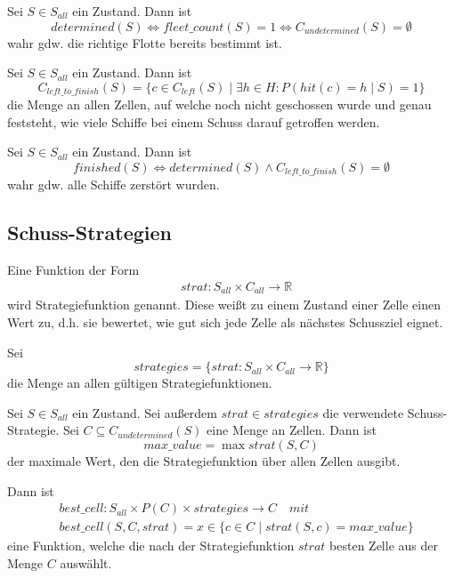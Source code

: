 \documentclass[a4paper,12pt]{llncs}
\numberwithin{equation}{section}
\begin{document}
\begin{definition}
Sei $S\in S_{all}$ ein Zustand.
Dann ist
\[
determined(S) \Leftrightarrow fleet\_count(S)=1 \Leftrightarrow C_{undetermined}(S) = \emptyset
\]
wahr gdw. die richtige Flotte bereits bestimmt ist.
\end{definition}


\begin{definition}
Sei $S\in S_{all}$ ein Zustand.
Dann ist
\[
C_{left\_to\_finish}(S)=\{ c \in C_{left}(S) \mid \exists h \in H \colon P(hit(c)=h \mid S) = 1\}
\]
die Menge an allen Zellen, auf welche noch nicht geschossen wurde und genau feststeht, wie viele Schiffe bei einem Schuss darauf getroffen werden.
\end{definition}

\begin{definition}
Sei $S\in S_{all}$ ein Zustand.
Dann ist
\[
finished(S) \Leftrightarrow determined(S) \land C_{left\_to\_finish}(S) = \emptyset
\]
wahr gdw. alle Schiffe zerstört wurden.
\end{definition}

\subsection{Schuss-Strategien}

\begin{definition}
Eine Funktion der Form
\begin{align}
&strat:S_{all} \times C_{all} \rightarrow \mathbb{R} \nonumber
\end{align}
wird Strategiefunktion genannt. Diese weißt zu einem Zustand einer Zelle einen Wert zu, d.h. sie bewertet, wie gut sich jede Zelle als nächstes Schussziel eignet.
\end{definition}

\begin{definition}
Sei
\[
strategies=\{ strat:S_{all} \times C_{all} \rightarrow \mathbb{R} \}
\]
die Menge an allen gültigen Strategiefunktionen.
\end{definition}

\begin{definition}
Sei $S\in S_{all}$ ein Zustand.
Sei außerdem $strat \in strategies$ die verwendete Schuss-Strategie.
Sei $C \subseteq C_{undetermined}(S)$ eine Menge an Zellen.
Dann ist
\[
max\_value=\max strat(S, C)
\]
der maximale Wert, den die Strategiefunktion über allen Zellen ausgibt.

Dann ist
\begin{align}
&best\_cell:S_{all} \times P(C) \times strategies \rightarrow C \quad mit \nonumber\\
&best\_cell(S, C, strat)=x \in \{c \in C \mid strat(S, c) = max\_value\}
\nonumber
\end{align}
eine Funktion, welche die nach der Strategiefunktion $strat$ besten Zelle aus der Menge $C$ auswählt.
\end{definition}
\end{document}

